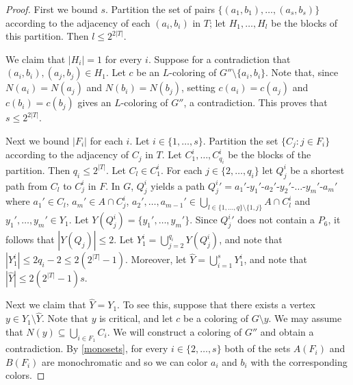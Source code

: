 \documentclass[11pt]{article}
\begin{document}
\begin{proof}
First we bound $s$.
Partition the set of pairs $\{(a_1,b_1), \ldots, (a_s,b_s)\}$ according to the 
adjacency of each $(a_i,b_i)$ in $T$; let $H_1, \ldots, H_l$ be the blocks of this partition.  Then $l \leq 2^{2|T|}$.

We claim that $|H_i|=1$ for every $i$. 
Suppose for a contradiction  that $(a_i,b_i), (a_j,b_j) \in H_1$. 
Let $c$ be an $L$-coloring of $G'' \setminus \{a_i, b_i\}$. 
Note that, since $N(a_i)=N(a_j)$ and $N(b_i)=N(b_j)$, setting $c(a_i)=c(a_j)$ and $c(b_i)=c(b_j)$  gives an $L$-coloring of $G''$, a contradiction. 
This proves that $s\leq 2^{2|T|}$.

Next we bound $|F_i|$ for each $i$. Let $i \in \{1, \ldots, s\}$.
Partition the set $\{C_j: j \in F_i\}$
according to the adjacency of $C_j$ in $T$.
Let $C_1^i, \ldots, C_{q_i}^i$ be the blocks of the partition.
Then $q_i\leq 2^{|T|}$.
Let $C_l \in C_1^i$.
For each $j \in \{2, \ldots, q_i\}$ let $Q^i_j$ be a shortest path from $C_l$ to $C_j^i$ in $F$. 
In $G$, $Q^i_j$ yields a path ${Q^i_j}'= a_1'$-$y_1'$-$a_2'$-$y_2'$-$\ldots$-$y_m'$-$a_m'$ where $a_1' \in C_l$, $a_m' \in A \cap C_j^i$, $a_2',\ldots,a_{m-1}' \in \bigcup_{l \in \{1, \ldots, q\} \setminus \{1,j\}}A \cap C_l^i$ and $y_1', \ldots, y_m' \in Y_1$. 
Let $Y(Q^i_j)=\{y_1', \ldots, y_m'\}$.
Since ${Q^i_j}'$ does not contain a $P_6$, it follows that $|Y(Q_j)| \leq 2$.
Let $Y_1^i=\bigcup_{j=2}^{q_i} Y(Q^i_j)$, and note that 
$|Y_1^i| \leq 2q_i-2 \leq 2(2^{|T|}-1)$. 
Moreover, let $\hat{Y}=\bigcup_{i=1}^s Y_1^i$, and note that 
$|\hat{Y}| \leq  2(2^{|T|}-1)s$.

Next we claim that $\hat{Y}=Y_1$. 
To see this, suppose that there exists a vertex $y \in Y_1 \setminus \hat{Y}$.
Note that $y$ is critical, and let $c$ be a coloring of $G \setminus y$.
We may assume that $N(y) \subseteq \bigcup_{i \in F_1} C_i$.
We will construct a coloring of $G''$ and obtain a contradiction.
By \eqref{monosets}, for every $i \in \{2, \ldots, s\}$ both of the sets $A(F_i)$ and $B(F_i)$ are monochromatic and so we can color $a_i$ and $b_i$ with the corresponding colors.


\end{proof}
\end{document}
